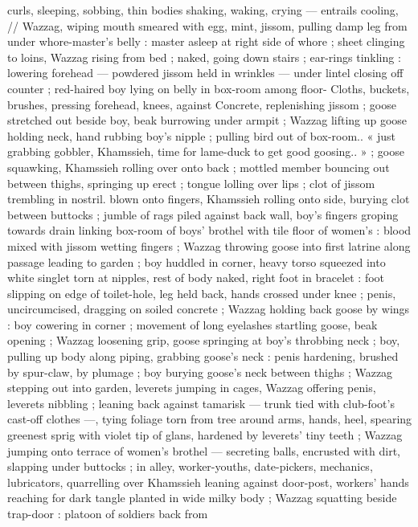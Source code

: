 curls, sleeping, sobbing, thin bodies shaking, waking, crying ---
entrails cooling, // Wazzag, wiping mouth smeared with egg, mint,
jissom, pulling damp leg from under whore-master's belly : master
asleep at right side of whore ; sheet clinging to loins, Wazzag rising
from bed ; naked, going down stairs ; ear-rings tinkling : lowering
forehead --- powdered jissom held in wrinkles --- under lintel closing
off counter ; red-haired boy lying on belly in box-room among floor-
Cloths, buckets, brushes, pressing forehead, knees, against
Concrete, replenishing jissom ; goose stretched out beside boy, beak
burrowing under armpit ; Wazzag lifting up goose holding neck, hand
rubbing boy's nipple ; pulling bird out of box-room.. « just grabbing
gobbler, Khamssieh, time for lame-duck to get good goosing.. » ;
goose squawking, Khamssieh rolling over onto back ; mottled %
member bouncing out between thighs, springing up erect ; tongue
lolling over lips ; clot of jissom trembling in nostril. blown onto
fingers, Khamssieh rolling onto side, burying clot between buttocks ;
jumble of rags piled against back wall, boy's fingers groping towards
drain linking box-room of boys’ brothel with tile floor of women’s :
blood mixed with jissom wetting fingers ; Wazzag throwing goose into
first latrine along passage leading to garden ; boy huddled in corner,
heavy torso squeezed into white singlet torn at nipples, rest of body
naked, right foot in bracelet : foot slipping on edge of toilet-hole, leg
held back, hands crossed under knee ; penis, uncircumcised,
dragging on soiled concrete ; Wazzag holding back goose by wings :
boy cowering in corner ; movement of long eyelashes startling
goose, beak opening ; Wazzag loosening grip, goose springing at
boy's throbbing neck ; boy, pulling up body along piping, grabbing
goose’s neck : penis hardening, brushed by spur-claw, by plumage ;
boy burying goose’s neck between thighs ; Wazzag stepping out into
garden, leverets jumping in cages, Wazzag offering penis, leverets
nibbling ; leaning back against tamarisk --- trunk tied with club-foot's
cast-off clothes ---, tying foliage torn from tree around arms, hands,
heel, spearing greenest sprig with violet tip of glans, hardened by
leverets’ tiny teeth ; Wazzag jumping onto terrace of women's
brothel --- secreting balls, encrusted with dirt, slapping under
buttocks ; in alley, worker-youths, date-pickers, mechanics,
lubricators, quarrelling over Khamssieh leaning against door-post,
workers’ hands reaching for dark tangle planted in wide milky body
; Wazzag squatting beside trap-door : platoon of soldiers back from
